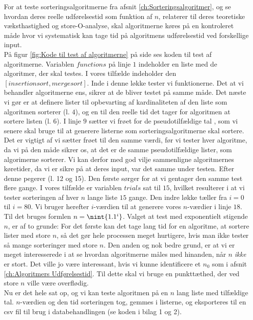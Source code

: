 For at teste sorteringsalgoritmerne fra afsnit \ref{ch:Sorteringsalgoritmer}, og se hvordan deres reelle udførelsestid som funktion af $n$, relaterer til deres teoretiske væksthastighed og store-O-analyse, skal algoritmerne køres på en kontroleret måde hvor vi systematisk kan tage tid på algoritmens udførelsestid ved forskellige input.\\

På figur \ref{fig:Kode til test af algoritmerne} på side \pageref{fig:Kode til test af algoritmerne} ses koden til test af algoritmerne. Variablen $functions$ på linje $1$ indeholder en liste med de algoritmer, der skal testes. I vores tilfælde indeholder den $[insertionsort,mergesort]$. Inde i denne løkke tester vi funktionerne. Det at vi behandler algoritmerne ens, sikrer at de bliver testet på samme måde. Det næste vi gør er at definere lister til opbevarting af kardinaliteten af den liste som algoritmen sorterer (l. $4$), og en til den reelle tid det tager for algoritmen at sortere listen (l. 6).  I linje $9$ sætter vi frøet for de pseudotilfældige tal \cite{python-random}, som vi senere skal bruge til at generere listerne som sorteringsalgoritmerne skal sortere. Det er vigtigt af vi sætter frøet til den samme værdi, før vi tester hver algoritme, da vi på den måde sikrer os, at det er de samme pseudotilfældige lister, som algorimerne sorterer. Vi kan derfor med god vilje sammenligne algoritmernes køretider, da vi er sikre på at deres input, var det samme under testen. Efter denne pegerer (l. 12 og 15). Den første sørger for at vi gentager den samme test flere gange. I vores tilfælde er variablen $trials$ sat til $15$, hvilket resulterer i at vi tester sorteringen af hver $n$ lange liste $15$ gange. Den indre løkke tæller fra $i=0$ til $i=80$. Vi bruger herefter $i$-værdien til at generere vores $n$-værdier i linje $18$. Til det bruges formlen $n=\nint{1.1^i}$. Valget at test med exponentielt stigende $n$, er af to grunde: For det første kan det tage lang tid for en algoritme, at sortere lister med store $n$, så det gør hele processen meget hurtigere, hvis man ikke tester så mange sorteringer med store $n$. Den anden og nok bedre grund, er at vi er meget interesserede i at se hvordan algoritmerne måles med hinanden, når $n$ \emph{ikke} er stort. Det ville jo være interessant, hvis vi kunne identificere et $n_0$ som i afsnit \ref{ch:Algoritmers Udførelsestid}. Til dette skal vi bruge en punkttæthed, der ved store $n$ ville være overflødig.\\

Nu er det hele sat op, og vi kan teste algoritmen på en $n$ lang liste med tilfældige tal. $n$-værdien og den tid sorteringen tog, gemmes i listerne, og eksporteres til en csv fil til brug i databehandlingen (se koden i bilag 1 og 2).

